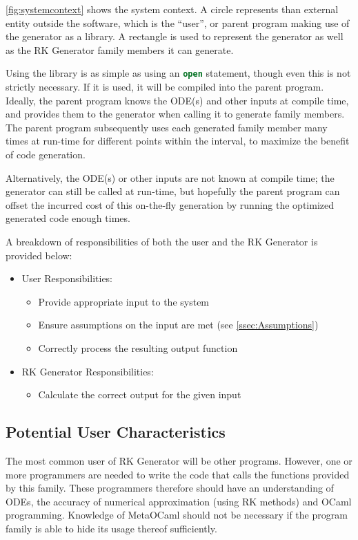\documentclass[12pt]{article}
\newcommand{\famname}{RK Generator} %
\begin{document}
\autoref{fig:systemcontext} shows the system context. A circle represents than 
external entity outside the software, which is the ``user'', or parent program 
making use of the generator as a library. A rectangle is used to represent the 
generator as well as the \famname{} family members it can generate. 

Using the library is as simple as using an \lstinline[language=ML]|open| 
statement, though even this is not strictly necessary. If it is used, it will 
be compiled into the parent program.
Ideally, the parent program knows the ODE(s) and other inputs at compile time, 
and provides them to the generator when calling it to generate family members.
The parent program subsequently uses each generated family member many times at 
run-time for different points within the interval, to maximize the benefit of 
code generation.

Alternatively, the ODE(s) or other inputs are not known at compile time; the 
generator can still be called at run-time, but hopefully the parent program can 
offset the incurred cost of this on-the-fly generation by running the optimized 
generated code enough times.

A breakdown of responsibilities of both the user and the \famname{} is provided 
below:
\begin{itemize}
\item User Responsibilities:
\begin{itemize}
\item Provide appropriate input to the system
\item Ensure assumptions on the input are met (see \autoref{ssec:Assumptions})
\item Correctly process the resulting output function
\end{itemize}
\item \famname{} Responsibilities:
\begin{itemize}
\item Calculate the correct output for the given input
\end{itemize}
\end{itemize}

\subsection{Potential User Characteristics} \label{SecUserCharacteristics}

The most common user of \famname{} will be other programs. However, one or more 
programmers are needed to write the code that calls the functions provided by 
this family.
These programmers therefore should have an understanding of ODEs, the accuracy 
of numerical approximation (using RK methods) and OCaml programming. Knowledge 
of MetaOCaml should not be necessary 
if the program family is able to hide its usage thereof sufficiently.
\end{document}
